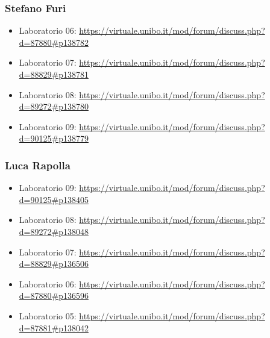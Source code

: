 \documentclass[a4paper,12pt]{report}
\begin{document}
\begin{appendices}
\subsubsection{Stefano Furi}
\begin{itemize}
    \item Laboratorio 06:
    \url{https://virtuale.unibo.it/mod/forum/discuss.php?d=87880#p138782}
    \item Laboratorio 07:
    \url{https://virtuale.unibo.it/mod/forum/discuss.php?d=88829#p138781}
    \item Laboratorio 08:
    \url{https://virtuale.unibo.it/mod/forum/discuss.php?d=89272#p138780}
    \item Laboratorio 09:
    \url{https://virtuale.unibo.it/mod/forum/discuss.php?d=90125#p138779}
\end{itemize}

\subsubsection{Luca Rapolla}
\begin{itemize}
    \item Laboratorio 09:
    \url{https://virtuale.unibo.it/mod/forum/discuss.php?d=90125#p138405}
    \item Laboratorio 08:
    \url{https://virtuale.unibo.it/mod/forum/discuss.php?d=89272#p138048}
    \item Laboratorio 07:
    \url{https://virtuale.unibo.it/mod/forum/discuss.php?d=88829#p136506}
    \item Laboratorio 06:
    \url{https://virtuale.unibo.it/mod/forum/discuss.php?d=87880#p136596}
    \item Laboratorio 05:
    \url{https://virtuale.unibo.it/mod/forum/discuss.php?d=87881#p138042}
\end{itemize}

\end{appendices}
\end{document}
